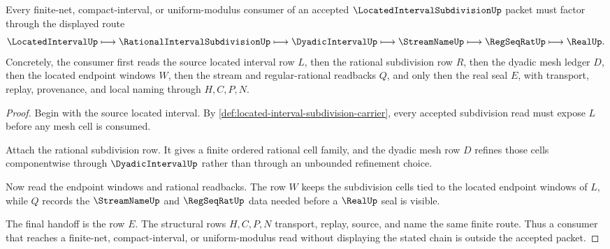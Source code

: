 \begin{theorem}
\label{thm:located-interval-subdivision-dyadic-mesh-handoff}
Every finite-net, compact-interval, or uniform-modulus consumer of an accepted $\LocatedIntervalSubdivisionUp$ packet must factor through the displayed route
$$
\LocatedIntervalUp \longmapsto \RationalIntervalSubdivisionUp \longmapsto \DyadicIntervalUp \longmapsto \StreamNameUp \longmapsto \RegSeqRatUp \longmapsto \RealUp .
$$
Concretely, the consumer first reads the source located interval row $L$, then the rational subdivision row $R$, then the dyadic mesh ledger $D$, then the located endpoint windows $W$, then the stream and regular-rational readbacks $Q$, and only then the real seal $E$, with transport, replay, provenance, and local naming through $H,C,P,N$.
\end{theorem}
\begin{proof}
Begin with the source located interval. By \autoref{def:located-interval-subdivision-carrier}, every accepted subdivision read must expose $L$ before any mesh cell is consumed.

Attach the rational subdivision row. It gives a finite ordered rational cell family, and the dyadic mesh row $D$ refines those cells componentwise through $\DyadicIntervalUp$ rather than through an unbounded refinement choice.

Now read the endpoint windows and rational readbacks. The row $W$ keeps the subdivision cells tied to the located endpoint windows of $L$, while $Q$ records the $\StreamNameUp$ and $\RegSeqRatUp$ data needed before a $\RealUp$ seal is visible.

The final handoff is the row $E$. The structural rows $H,C,P,N$ transport, replay, source, and name the same finite route. Thus a consumer that reaches a finite-net, compact-interval, or uniform-modulus read without displaying the stated chain is outside the accepted packet.
\end{proof}



